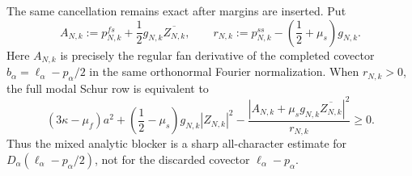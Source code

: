 \begin{contract}
The same cancellation remains exact after margins are inserted.  Put
\[
 A_{N,k}:=p^{fs}_{N,k}
 +\frac12g_{N,k}\overline{Z_{N,k}},
 \qquad
 r_{N,k}:=p^{ss}_{N,k}
 -\left(\frac12+\mu_s\right)g_{N,k}.
\]
Here $A_{N,k}$ is precisely the regular fan derivative of the completed
covector $b_\alpha=\ell_\alpha-p_\alpha/2$ in the same orthonormal
Fourier normalization.  When $r_{N,k}>0$, the full modal Schur row is
equivalent to
\begin{equation}\label{JC:eq:regular-action-reduced-Schur}
 \boxed{
 (3\kappa-\mu_f)a^2
 +\left(\frac12-\mu_s\right)g_{N,k}|Z_{N,k}|^2
 -\frac{|A_{N,k}+\mu_sg_{N,k}\overline{Z_{N,k}}|^2}
 {r_{N,k}}\ge0.}
\end{equation}
Thus the mixed analytic blocker is a sharp all-character estimate for
$D_\alpha(\ell_\alpha-p_\alpha/2)$, not for the discarded covector
$\ell_\alpha-p_\alpha$.


\end{contract}
